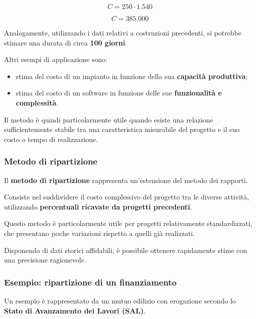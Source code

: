 \[
C=250\cdot1.540
\]

\[
\boxed{C=385.000}
\]

\noindent Analogamente, utilizzando i dati relativi
a costruzioni precedenti, si potrebbe stimare
una durata di circa \textbf{100 giorni}.

\medskip

\noindent Altri esempi di applicazione sono:

\begin{itemize}
    \item stima del costo di un impianto in funzione
    della sua \textbf{capacità produttiva};

    \item stima del costo di un software in funzione
    delle sue \textbf{funzionalità e complessità}.
\end{itemize}

\noindent Il metodo è quindi particolarmente utile
quando esiste una relazione sufficientemente stabile
tra una caratteristica misurabile del progetto
e il suo costo o tempo di realizzazione.


\subsubsection*{Metodo di ripartizione}

\noindent Il \textbf{metodo di ripartizione} rappresenta
un'estensione del metodo dei rapporti.

\medskip

\noindent Consiste nel suddividere il costo complessivo
del progetto tra le diverse attività, utilizzando
\textbf{percentuali ricavate da progetti precedenti}.

\medskip

\noindent Questo metodo è particolarmente utile
per progetti relativamente standardizzati,
che presentano poche variazioni rispetto
a quelli già realizzati.

\medskip

\noindent Disponendo di dati storici affidabili,
è possibile ottenere rapidamente stime
con una precisione ragionevole.

\subsubsection*{Esempio: ripartizione di un finanziamento}

\noindent Un esempio è rappresentato da un mutuo edilizio
con erogazione secondo lo \textbf{Stato di Avanzamento
dei Lavori (SAL)}.


